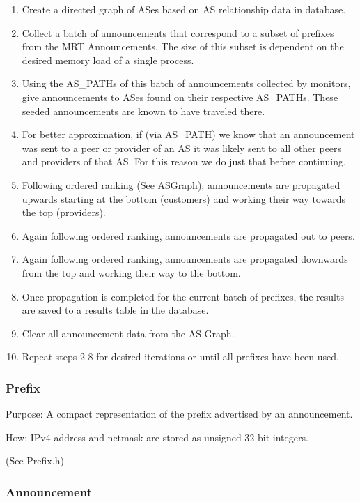 \documentclass[letterpaper]{article}
\providecommand{\tightlist}{%
  \setlength{\itemsep}{0pt}\setlength{\parskip}{0pt}}
\begin{document}
\begin{enumerate}
\def\labelenumi{\arabic{enumi}.}
\tightlist
\item
  Create a directed graph of ASes based on AS relationship data in
  database.
\item
  Collect a batch of announcements that correspond to a subset of
  prefixes from the MRT Announcements. The size of this subset is
  dependent on the desired memory load of a single process.
\item
  Using the AS\_PATHs of this batch of announcements collected by
  monitors, give announcements to ASes found on their respective
  AS\_PATHs. These seeded announcements are known to have traveled
  there.
\item
  For better approximation, if (via AS\_PATH) we know that an
  announcement was sent to a peer or provider of an AS it was likely
  sent to all other peers and providers of that AS. For this reason we
  do just that before continuing.
\item
  Following ordered ranking (See \protect\hyperlink{ASGraph}{ASGraph}),
  announcements are propagated upwards starting at the bottom
  (customers) and working their way towards the top (providers).
\item
  Again following ordered ranking, announcements are propagated out to
  peers.
\item
  Again following ordered ranking, announcements are propagated
  downwards from the top and working their way to the bottom.
\item
  Once propagation is completed for the current batch of prefixes, the
  results are saved to a results table in the database.
\item
  Clear all announcement data from the AS Graph.
\item
  Repeat steps 2-8 for desired iterations or until all prefixes have
  been used.
\end{enumerate}

\hypertarget{prefix}{%
\subsubsection{Prefix}\label{prefix}}

Purpose: A compact representation of the prefix advertised by an
announcement.

How: IPv4 address and netmask are stored as unsigned 32 bit integers.

(See Prefix.h)

\hypertarget{announcement}{%
\subsubsection{Announcement}\label{announcement}}
\end{document}

